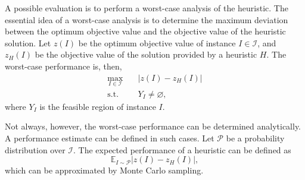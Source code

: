 A possible evaluation is to perform a worst-case analysis of the heuristic.
The essential idea of a worst-case analysis is to determine the maximum deviation between the optimum objective value and the objective value of the heuristic solution. 
Let $z(I)$ be the optimum objective value of instance $I\in \mathcal{I}$, and $z_H(I)$ be the objective value of the solution provided by a heuristic $H$.
The worst-case performance is, then,
\begin{equation}
    \begin{split}
	\max_{I\in \mathcal{I}} \quad& |z(I) - z_H(I)| \\
	\textrm{s.t.} \quad& Y_I \neq \varnothing
    ,\end{split}
\end{equation}
where $Y_I$ is the feasible region of instance $I$.

Not always, however, the worst-case performance can be determined analytically.
A performance estimate can be defined in such cases.
Let $\mathcal{P}$ be a probability distribution over $\mathcal{I}$.
The expected performance of a heuristic can be defined as \[
    \mathbb{E}_{I\sim \mathcal{P}} |z(I) - z_H(I)|
,\] which can be approximated by Monte Carlo sampling.



